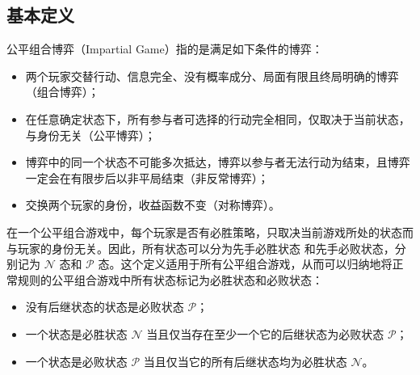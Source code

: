 \documentclass[12pt,a4paper]{article}
\begin{document}
\subsection{基本定义}
公平组合博弈（Impartial Game）指的是满足如下条件的博弈：
\begin{itemize}
	\item 两个玩家交替行动、信息完全、没有概率成分、局面有限且终局明确的博弈（组合博弈）；
	\item 在任意确定状态下，所有参与者可选择的行动完全相同，仅取决于当前状态，与身份无关（公平博弈）；
	\item 博弈中的同一个状态不可能多次抵达，博弈以参与者无法行动为结束，且博弈一定会在有限步后以非平局结束（非反常博弈）；
	\item 交换两个玩家的身份，收益函数不变（对称博弈）。
\end{itemize}
在一个公平组合游戏中，每个玩家是否有必胜策略，只取决当前游戏所处的状态而与玩家的身份无关。因此，所有状态可以分为先手必胜状态 和先手必败状态，分别记为 $\mathcal N$ 态和 $\mathcal P$ 态。这个定义适用于所有公平组合游戏，从而可以归纳地将正常规则的公平组合游戏中所有状态标记为必胜状态和必败状态：
\begin{itemize}
	\item 没有后继状态的状态是必败状态 $\mathcal P$；
	\item 一个状态是必胜状态 $\mathcal N$ 当且仅当存在至少一个它的后继状态为必败状态 $\mathcal P$；
	\item 一个状态是必败状态 $\mathcal P$ 当且仅当它的所有后继状态均为必胜状态 $\mathcal N$。
\end{itemize}
\end{document}

